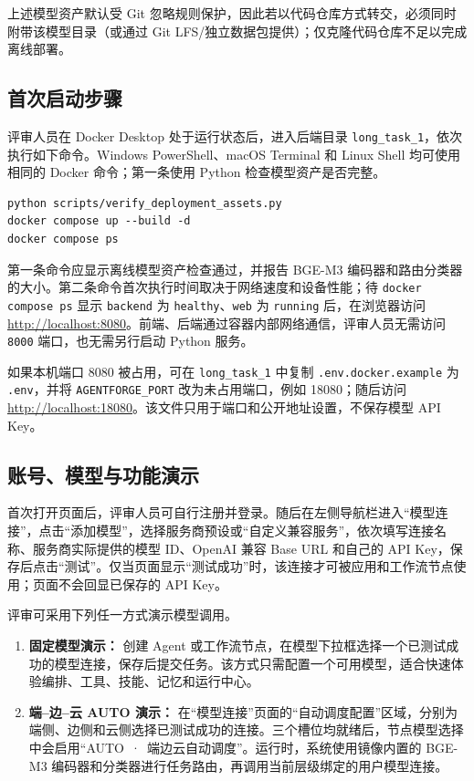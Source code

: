 上述模型资产默认受 Git 忽略规则保护，因此若以代码仓库方式转交，必须同时附带该模型目录（或通过 Git LFS/独立数据包提供）；仅克隆代码仓库不足以完成离线部署。

\subsection{首次启动步骤}

评审人员在 Docker Desktop 处于运行状态后，进入后端目录 \texttt{long\_task\_1}，依次执行如下命令。Windows PowerShell、macOS Terminal 和 Linux Shell 均可使用相同的 Docker 命令；第一条使用 Python 检查模型资产是否完整。

\begin{verbatim}
python scripts/verify_deployment_assets.py
docker compose up --build -d
docker compose ps
\end{verbatim}

第一条命令应显示离线模型资产检查通过，并报告 BGE-M3 编码器和路由分类器的大小。第二条命令首次执行时间取决于网络速度和设备性能；待 \texttt{docker compose ps} 显示 \texttt{backend} 为 \texttt{healthy}、\texttt{web} 为 \texttt{running} 后，在浏览器访问 \url{http://localhost:8080}。前端、后端通过容器内部网络通信，评审人员无需访问 \texttt{8000} 端口，也无需另行启动 Python 服务。

如果本机端口 8080 被占用，可在 \texttt{long\_task\_1} 中复制 \texttt{.env.docker.example} 为 \texttt{.env}，并将 \texttt{AGENTFORGE\_PORT} 改为未占用端口，例如 18080；随后访问 \url{http://localhost:18080}。该文件只用于端口和公开地址设置，不保存模型 API Key。

\subsection{账号、模型与功能演示}

首次打开页面后，评审人员可自行注册并登录。随后在左侧导航栏进入``模型连接''，点击``添加模型''，选择服务商预设或``自定义兼容服务''，依次填写连接名称、服务商实际提供的模型 ID、OpenAI 兼容 Base URL 和自己的 API Key，保存后点击``测试''。仅当页面显示``测试成功''时，该连接才可被应用和工作流节点使用；页面不会回显已保存的 API Key。

评审可采用下列任一方式演示模型调用。

\begin{enumerate}
  \item \textbf{固定模型演示：} 创建 Agent 或工作流节点，在模型下拉框选择一个已测试成功的模型连接，保存后提交任务。该方式只需配置一个可用模型，适合快速体验编排、工具、技能、记忆和运行中心。
  \item \textbf{端--边--云 AUTO 演示：} 在``模型连接''页面的``自动调度配置''区域，分别为端侧、边侧和云侧选择已测试成功的连接。三个槽位均就绪后，节点模型选择中会启用``AUTO~·~端边云自动调度''。运行时，系统使用镜像内置的 BGE-M3 编码器和分类器进行任务路由，再调用当前层级绑定的用户模型连接。
\end{enumerate}


